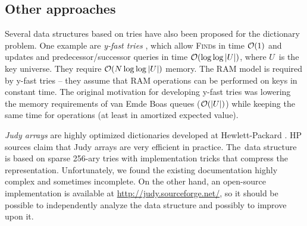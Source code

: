 \subsection*{Other approaches}
Several data structures based on tries have also been proposed for the
dictionary problem. One example are \emph{y-fast tries} \cite{y-fast},
which allow \textsc{Find}s in time $\mathcal{O}(1)$ and updates and predecessor/successor
queries in time $\mathcal{O}(\log\log |U|)$, where $U$~is the key universe. They require
$\mathcal{O}(N \log\log |U|)$ memory.
The RAM model is required by y-fast tries -- they assume that RAM operations
can be performed on keys in constant time.
The original motivation for developing y-fast tries was lowering the memory
requirements of van Emde Boas queues ($\mathcal{O}(|U|)$) while keeping the same time
for operations (at least in amortized expected value).

\emph{Judy arrays} are highly optimized dictionaries developed at
Hewlett-Packard \cite{judy-shop-manual, judy-patent}.
HP sources claim that Judy arrays are very efficient in practice.
The~data structure is based on sparse 256-ary tries with implementation tricks
that compress the representation.
Unfortunately, we found the existing documentation highly complex and sometimes
incomplete. On the other hand, an open-source implementation is available
at \url{http://judy.sourceforge.net/}, so it should be possible to independently
analyze the data structure and possibly to improve upon it.
